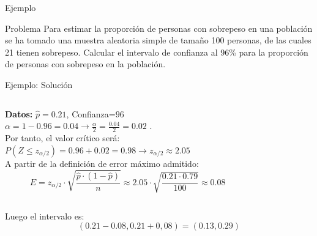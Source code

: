 \documentclass[11pt,handout]{beamer}
\begin{document}
\begin{frame}
{Ejemplo}
\begin{block}{Problema} Para estimar la proporción de personas con sobrepeso en una población se ha tomado una
muestra aleatoria simple de tamaño 100 personas, de las cuales 21 tienen sobrepeso. Calcular el intervalo
de confianza al 96\% para la proporción de personas con sobrepeso en la población.
\end{block}
\end{frame}

\begin{frame}{Ejemplo: Solución}
\begin{columns}
\begin{column}{0.55\textwidth}
    \textbf{Datos:} $\widehat{p}=0.21$, Confianza=$96$ \\
$\alpha=1-0.96=0.04 \to \frac{\alpha}{2}=\frac{0.04}{2}=0.02$
. \\ Por tanto, el valor crítico será: \\

$P\left(Z \leqslant z_{\alpha / 2} \right)= 0.96 + 0.02 = 0.98 \to z_{\alpha / 2} \approx 2.05$ \\ 
A partir de la definición de error máximo admitido:
$$E=z_{\alpha / 2}\cdot \sqrt{\frac{\widehat{p}\cdot\left(1-\widehat{p} \right)}{n}}\approx 2.05 \cdot \sqrt{\frac{0.21\cdot 0.79}{100}}\approx 0.08$$

\end{column}
\begin{column}{0.45\textwidth}
    
\end{column}
\end{columns}
Luego el intervalo es: $$\left( 0.21 - 0.08 , 0.21 + 0,08 \right) = \left(0.13, 0.29 \right)$$ 
\end{frame}
\end{document}
